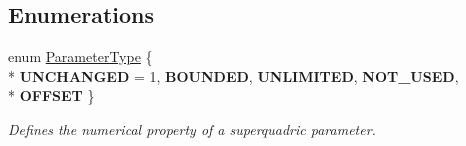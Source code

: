 \subsection*{Enumerations}
\begin{DoxyCompactItemize}
\item 
enum \hyperlink{namespaceope_a369d89d74d4649418822f9acefc317c6}{Parameter\-Type} \{ \\*
{\bfseries U\-N\-C\-H\-A\-N\-G\-E\-D} = 1, 
{\bfseries B\-O\-U\-N\-D\-E\-D}, 
{\bfseries U\-N\-L\-I\-M\-I\-T\-E\-D}, 
{\bfseries N\-O\-T\-\_\-\-U\-S\-E\-D}, 
\\*
{\bfseries O\-F\-F\-S\-E\-T}
 \}
\begin{DoxyCompactList}\small\item\em Defines the numerical property of a superquadric parameter. \end{DoxyCompactList}\end{DoxyCompactItemize}
